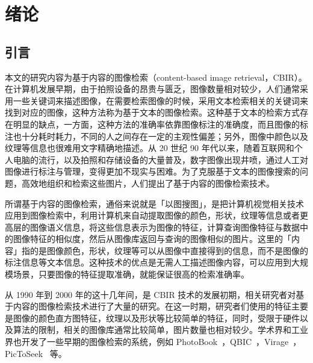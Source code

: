
\chapter{绪论}
\label{Chapter_introduction}

\section{引言}
本文的研究内容为基于内容的图像检索（content-based image retrieval，CBIR）。在计算机发展早期，由于拍照设备的昂贵与匮乏，图像数量相对较少，人们通常采用一些关键词来描述图像，在需要检索图像的时候，采用文本检索相关的关键词来找到对应的图像，这种方法称为基于文本的图像检索。这种基于文本的检索方式存在明显的缺点，一方面，这种方法的准确率依靠图像标注的准确度，而且图像的标注也十分耗时耗力，不同的人之间存在一定的主观性偏差；另外，图像中颜色以及纹理等信息也很难用文字精确地描述。从 20 世纪 90 年代以来，随着互联网和个人电脑的流行，以及拍照和存储设备的大量普及，数字图像出现井喷，通过人工对图像进行标注与管理，变得更加不现实与困难。为了克服基于文本的图像搜索的问题，高效地组织和检索这些图片，人们提出了基于内容的图像检索技术。

所谓基于内容的图像检索，通俗来说就是「以图搜图」，是把计算机视觉相关技术应用到图像检索中，利用计算机来自动提取图像的颜色，形状，纹理等信息或者更高层的图像语义信息，将这些信息表示为图像的特征，计算查询图像特征与数据中的图像特征的相似度，然后从图像库返回与查询的图像相似的图片。这里的「内容」指的是图像颜色，形状，纹理等可以从图像中直接得到的信息，而不是图像的标注信息等文本信息。这种技术的优点是无需人工描述图像内容，可以应用到大规模场景，只要图像的特征提取准确，就能保证很高的检索准确率。

从 1990 年到 2000 年的这十几年间，是 CBIR 技术的发展初期，相关研究者对基于内容的图像检索技术进行了大量的研究。在这一时期，研究者们使用的特征主要是图像的颜色直方图特征，纹理以及形状等比较简单的特征，同时，受限于硬件以及算法的限制，相关的图像库通常比较简单，图片数量也相对较少。学术界和工业界也开发了一些早期的图像检索的系统，例如 PhotoBook~\cite{Pentland1996PhotobookCM}，QBIC~\cite{Niblack1993TheQP}，Virage~\cite{Bach1996VirageIS}，PicToSeek~\cite{Gevers2000PicToSeekCC} 等。

